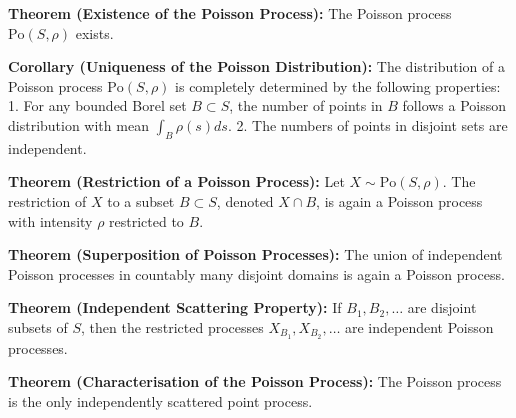 \documentclass{article}
\begin{document}
\textbf{Theorem (Existence of the Poisson Process):}  
The Poisson process $\text{Po}(S, \rho)$ exists.

\bigskip

\textbf{Corollary (Uniqueness of the Poisson Distribution):}  
The distribution of a Poisson process $\text{Po}(S, \rho)$ is completely determined by the following properties:
1. For any bounded Borel set $B \subset S$, the number of points in $B$ follows a Poisson distribution with mean $\int_B \rho(s) ds$.
2. The numbers of points in disjoint sets are independent.

\bigskip

\textbf{Theorem (Restriction of a Poisson Process):}  
Let $X \sim \text{Po}(S, \rho)$. The restriction of $X$ to a subset $B \subset S$, denoted $X \cap B$, is again a Poisson process with intensity $\rho$ restricted to $B$.

\bigskip

\textbf{Theorem (Superposition of Poisson Processes):}  
The union of independent Poisson processes in countably many disjoint domains is again a Poisson process.

\bigskip

\textbf{Theorem (Independent Scattering Property):}  
If $B_1, B_2, \dots$ are disjoint subsets of $S$, then the restricted processes $X_{B_1}, X_{B_2}, \dots$ are independent Poisson processes.

\bigskip

\textbf{Theorem (Characterisation of the Poisson Process):}  
The Poisson process is the only independently scattered point process.
\end{document}
